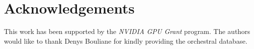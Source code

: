\documentclass{article}
\begin{document}
%
%

\section{Acknowledgements}
This work has been supported by the \textit{NVIDIA GPU Grant} program.
The authors would like to thank Denys Bouliane for kindly providing the orchestral database.


\end{document}

